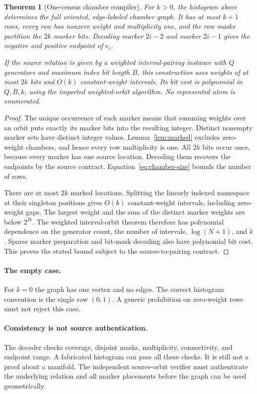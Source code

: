 \documentclass[11pt]{article}
\newtheorem{theorem}{Theorem}[section]
\theoremstyle{definition}
\begin{document}
\begin{theorem}[One-census chamber compiler]\label{thm:census}
For $k>0$, the histogram above determines the full oriented, edge-labeled chamber graph. It has at most $k+1$ rows, every row has nonzero weight and multiplicity one, and the row masks partition the $2k$ marker bits. Decoding marker $2i-2$ and marker $2i-1$ gives the negative and positive endpoint of $e_i$.

If the source relation is given by a weighted interval-pairing instance with $Q$ generators and maximum index bit length $B$, this construction uses weights of at most $2k$ bits and $O(k)$ constant-weight intervals. Its bit cost is polynomial in $Q,B,k$, using the imported weighted-orbit algorithm. No represented atom is enumerated.
\end{theorem}
\begin{proof}
The unique occurrence of each marker means that summing weights over an orbit puts exactly its marker bits into the resulting integer. Distinct nonempty marker sets have distinct integer values. Lemma~\ref{lem:marked} excludes zero-weight chambers, and hence every row multiplicity is one. All $2k$ bits occur once, because every marker has one source location. Decoding them recovers the endpoints by the source contract. Equation~\eqref{eq:chamber-size} bounds the number of rows.

There are at most $2k$ marked locations. Splitting the linearly indexed namespace at their singleton positions gives $O(k)$ constant-weight intervals, including zero-weight gaps. The largest weight and the sum of the distinct marker weights are below $2^{2k}$. The weighted interval-orbit theorem therefore has polynomial dependence on the generator count, the number of intervals, $\log(N+1)$, and $k$ \cite{aht}. Sparse marker preparation and bit-mask decoding also have polynomial bit cost. This proves the stated bound subject to the source-to-pairing contract.
\end{proof}

\paragraph{The empty case.} For $k=0$ the graph has one vertex and no edges. The correct histogram convention is the single row $(0,1)$. A generic prohibition on zero-weight rows must not reject this case.

\paragraph{Consistency is not source authentication.} The decoder checks coverage, disjoint masks, multiplicity, connectivity, and endpoint range. A fabricated histogram can pass all these checks. It is still not a proof about a manifold. The independent source-orbit verifier must authenticate the underlying relation and all marker placements before the graph can be used geometrically.
\end{document}
